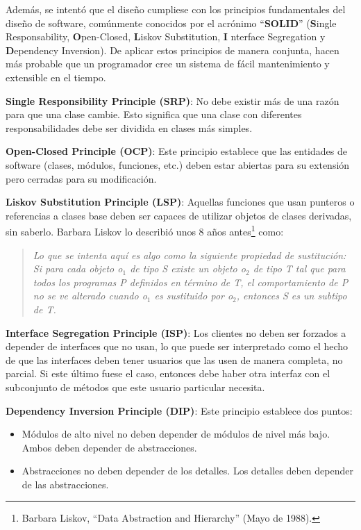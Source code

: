 		Adem\'as, se intent\'o que el dise\~no cumpliese con los principios fundamentales del dise\~no de software, com\'unmente conocidos 
    	por el acr\'onimo ``\textbf{SOLID}''\cite{objmentor} (\textbf{S}ingle Responsability, \textbf{O}pen-Closed, \textbf{L}iskov Substitution, \textbf{I}
    	nterface Segregation y \textbf{D}ependency Inversion). De aplicar estos principios de manera conjunta, hacen m\'as probable que un programador cree un 
    	sistema de f\'acil mantenimiento y extensible en el tiempo.
    	\begin{description}
    		\item \textbf{Single Responsibility Principle (SRP)}: No debe existir m\'as de una raz\'on para que una clase cambie. Esto significa que una clase con 
    		diferentes responsabilidades debe ser dividida en clases m\'as simples.
    		\item \textbf{Open-Closed Principle (OCP)}: Este principio establece que las entidades de software (clases, m\'odulos, funciones, etc.) deben estar 
    		abiertas para su extensi\'on pero cerradas para su modificaci\'on\cite{oosc}.
    		\item \textbf{Liskov Substitution Principle (LSP)}: Aquellas funciones que usan punteros o referencias a clases base deben ser capaces de utilizar 
    		objetos de clases derivadas, sin saberlo. Barbara Liskov lo describi\'o unos 8 a\~nos antes\footnote{Barbara Liskov, ``Data Abstraction and 
    		Hierarchy'' (Mayo de 1988).} como:
    		\begin{quote}
    		\textit{Lo que se intenta aqu\'i es algo como la siguiente propiedad de sustituci\'on: Si para cada objeto o$_1$ de tipo S existe un objeto o$_2$ de 
    		tipo T tal que para todos los programas P definidos en t\'ermino de T, el comportamiento de P no se ve alterado cuando o$_1$ es sustituido por o$_2$, 
    		entonces S es un subtipo de T.}
    		\end{quote}
    		\item \textbf{Interface Segregation Principle (ISP)}: Los clientes no deben ser forzados a depender de interfaces que no usan, lo que puede ser 
    		interpretado como el hecho de que las interfaces deben tener usuarios que las usen de manera completa, no parcial. Si este \'ultimo fuese el caso, 
    		entonces debe haber otra interfaz con el subconjunto de m\'etodos que este usuario particular necesita.
    		\item \textbf{Dependency Inversion Principle (DIP)}: Este principio establece dos puntos:
    		\begin{itemize}
    			\item M\'odulos de alto nivel no deben depender de m\'odulos de nivel m\'as bajo. Ambos deben depender de abstracciones.
    			\item Abstracciones no deben depender de los detalles. Los detalles deben depender de las abstracciones.
    		\end{itemize}	
    	\end{description}
	
